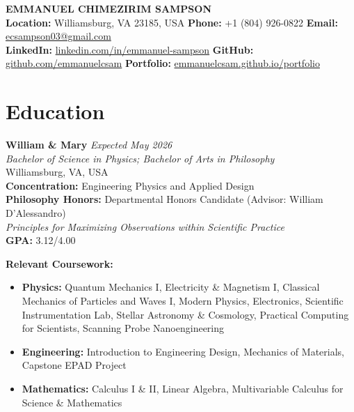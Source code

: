 \documentclass[11pt,letterpaper]{article}
\newcommand{\daterange}[1]{\textit{\color{secondary}#1}}
\newcommand{\organization}[1]{\textit{#1}}
\begin{document}
\begin{center}
    \color{primary}
    {\huge\bfseries EMMANUEL CHIMEZIRIM SAMPSON}\\[8pt]
    \color{black}
    \small
    \textbf{Location:} Williamsburg, VA 23185, USA \quad
    \textbf{Phone:} +1 (804) 926-0822 \quad
    \textbf{Email:} \href{mailto:ecsampson03@gmail.com}{ecsampson03@gmail.com}\\[4pt]
    \textbf{LinkedIn:} \href{https://linkedin.com/in/emmanuel-sampson}{linkedin.com/in/emmanuel-sampson} \quad
    \textbf{GitHub:} \href{https://github.com/emmanuelcsam}{github.com/emmanuelcsam} \quad
    \textbf{Portfolio:} \href{https://emmanuelcsam.github.io/portfolio}{emmanuelcsam.github.io/portfolio}
\end{center}

\vspace{-8pt}

\section{Education}

\noindent
\textbf{William \& Mary} \hfill \daterange{Expected May 2026}\\
\organization{Bachelor of Science in Physics; Bachelor of Arts in Philosophy}\\
Williamsburg, VA, USA\\[2pt]
\textbf{Concentration:} Engineering Physics and Applied Design\\
\textbf{Philosophy Honors:} Departmental Honors Candidate (Advisor: William D'Alessandro)\\
\quad\textit{Principles for Maximizing Observations within Scientific Practice}\\
\textbf{GPA:} 3.12/4.00

\vspace{8pt}
\noindent\textbf{Relevant Coursework:}
\vspace{-4pt}
\begin{itemize}
    \item \textbf{Physics:} Quantum Mechanics I, Electricity \& Magnetism I, Classical Mechanics of Particles and Waves I, Modern Physics, Electronics, Scientific Instrumentation Lab, Stellar Astronomy \& Cosmology, Practical Computing for Scientists, Scanning Probe Nanoengineering
    \item \textbf{Engineering:} Introduction to Engineering Design, Mechanics of Materials, Capstone EPAD Project
    \item \textbf{Mathematics:} Calculus I \& II, Linear Algebra, Multivariable Calculus for Science \& Mathematics
\end{itemize}
\end{document}
